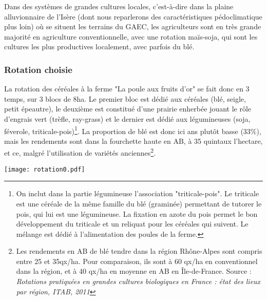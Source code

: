 \documentclass{article}
\begin{document}
Dans des systèmes de grandes cultures locales, c'est-à-dire dans la plaine alluvionnaire de l'Isère (dont nous reparlerons des caractéristiques pédoclimatique plus loin) où se situent les terrains du GAEC, les agriculteurs sont en très grande majorité en agriculture conventionnelle, avec une rotation maïs-soja, qui sont les cultures les plus productives localement, avec parfois du blé. 

\subsubsection{Rotation choisie}

La rotation des céréales à la ferme "La poule aux fruits d'or" se fait donc en 3 temps, sur 3 blocs de 8ha. Le premier bloc est dédié aux céréales (blé, seigle, petit épeautre), le deuxième est constitué d'une prairie enherbée jouant le rôle d’engrais vert (trèfle, ray-grass) et le dernier est dédié aux légumineuses (soja, féverole, triticale-pois)\footnote{On inclut dans la partie légumineuse l'association "triticale-pois". Le triticale est une céréale de la même famille du blé (graminée) permettant de tutorer le pois, qui lui est une légumineuse. La fixation en azote du pois permet le bon développement du triticale et un reliquat pour les céréales qui suivent. Le mélange est dédié à l'alimentation des poules de la ferme.}. La proportion de blé est donc ici ans plutôt basse (33\%), mais les rendements sont dans la fourchette haute en AB, à 35 quintaux l'hectare, et ce, malgré l'utilisation de variétés anciennes\footnote{Les rendements en AB de blé tendre dans la région Rhône-Alpes sont compris entre 25 et 35qx/ha. Pour comparaison, ils sont à 60 qx/ha en conventionnel dans la région, et à 40 qx/ha en moyenne en AB en Île-de-France. Source : \textit{Rotations pratiquées en grandes cultures biologiques en France : état des lieux par région, ITAB, 2011}}. 

\begin{center}
	\texttt{[image: rotation0.pdf]}
\end{center}
\end{document}
